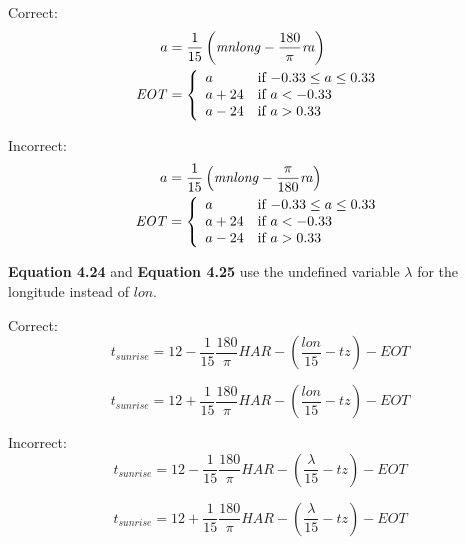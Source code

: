 \documentclass[report]{nrel}
\begin{document}
Correct:
\begin{align*}
a &= \frac{1}{15}\left(\mathit{mnlong} - \frac{180}{\pi}\mathit{ra}\right)\notag\\
\mathit{EOT} &= 
\left\{
   \begin{array}{ll}
     a & \text{if $-0.33 \leq a \leq 0.33$}\\
     a + 24 & \text{if $a<-0.33$}\\
     a - 24 & \text{if $a>0.33$}
   \end{array}
\right. 
\end{align*}

Incorrect:
\begin{align*}
a &= \frac{1}{15}\left(\mathit{mnlong} - \frac{\pi}{180}\mathit{ra}\right)\notag\\
\mathit{EOT} &= 
\left\{
   \begin{array}{ll}
     a & \text{if $-0.33 \leq a \leq 0.33$}\\
     a + 24 & \text{if $a<-0.33$}\\
     a - 24 & \text{if $a>0.33$}
   \end{array}
\right. 
\end{align*}

\textbf{Equation 4.24} and \textbf{Equation 4.25} use the undefined variable $\lambda$ for the longitude instead of $lon$.

Correct:
\begin{equation*}
t_{sunrise} = 12 - \frac{1}{15} \frac{180}{\pi}\mathit{HAR} - \left(\frac{\mathit{lon}}{15} - \mathit{tz}\right)-\mathit{EOT}
\end{equation*}

\begin{equation*}
t_{sunrise} = 12 + \frac{1}{15} \frac{180}{\pi}\mathit{HAR} - \left(\frac{\mathit{lon}}{15} - \mathit{tz}\right)-\mathit{EOT}
\end{equation*}

Incorrect:
\begin{equation*}
t_{sunrise} = 12 - \frac{1}{15} \frac{180}{\pi}\mathit{HAR} - \left(\frac{\lambda}{15} - \mathit{tz}\right)-\mathit{EOT}
\end{equation*}

\begin{equation*}
t_{sunrise} = 12 + \frac{1}{15} \frac{180}{\pi}\mathit{HAR} - \left(\frac{\lambda}{15} - \mathit{tz}\right)-\mathit{EOT}
\end{equation*}



\end{document}
